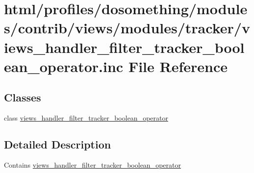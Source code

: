 \hypertarget{views__handler__filter__tracker__boolean__operator_8inc}{
\section{html/profiles/dosomething/modules/contrib/views/modules/tracker/views\_\-handler\_\-filter\_\-tracker\_\-boolean\_\-operator.inc File Reference}
\label{views__handler__filter__tracker__boolean__operator_8inc}
}
\subsection*{Classes}
\begin{DoxyCompactItemize}
\item 
class \hyperlink{classviews__handler__filter__tracker__boolean__operator}{views\_\-handler\_\-filter\_\-tracker\_\-boolean\_\-operator}
\end{DoxyCompactItemize}


\subsection{Detailed Description}
Contains \hyperlink{classviews__handler__filter__tracker__boolean__operator}{views\_\-handler\_\-filter\_\-tracker\_\-boolean\_\-operator} 